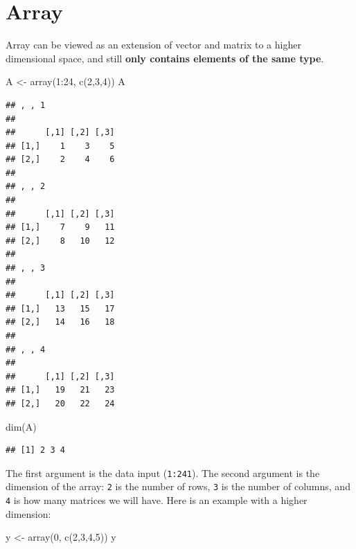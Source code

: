 \documentclass[
]{book}
\newenvironment{Shaded}{\begin{snugshade}}{\end{snugshade}}
\newcommand{\DecValTok}[1]{\textcolor[rgb]{0.00,0.00,0.81}{#1}}
\newcommand{\FunctionTok}[1]{\textcolor[rgb]{0.00,0.00,0.00}{#1}}
\newcommand{\NormalTok}[1]{#1}
\newcommand{\OtherTok}[1]{\textcolor[rgb]{0.56,0.35,0.01}{#1}}
\newcommand{\SpecialCharTok}[1]{\textcolor[rgb]{0.00,0.00,0.00}{#1}}
\theoremstyle{definition}
\theoremstyle{definition}
\theoremstyle{definition}
\theoremstyle{definition}
\theoremstyle{remark}
\begin{document}
\hypertarget{array}{%
\section{Array}\label{array}}

Array can be viewed as an extension of vector and matrix to a higher dimensional space, and still \textbf{only contains elements of the same type}.

\begin{Shaded}
\begin{Highlighting}[]
\NormalTok{A }\OtherTok{\textless{}{-}} \FunctionTok{array}\NormalTok{(}\DecValTok{1}\SpecialCharTok{:}\DecValTok{24}\NormalTok{, }\FunctionTok{c}\NormalTok{(}\DecValTok{2}\NormalTok{,}\DecValTok{3}\NormalTok{,}\DecValTok{4}\NormalTok{))}
\NormalTok{A}
\end{Highlighting}
\end{Shaded}

\begin{verbatim}
## , , 1
## 
##      [,1] [,2] [,3]
## [1,]    1    3    5
## [2,]    2    4    6
## 
## , , 2
## 
##      [,1] [,2] [,3]
## [1,]    7    9   11
## [2,]    8   10   12
## 
## , , 3
## 
##      [,1] [,2] [,3]
## [1,]   13   15   17
## [2,]   14   16   18
## 
## , , 4
## 
##      [,1] [,2] [,3]
## [1,]   19   21   23
## [2,]   20   22   24
\end{verbatim}

\begin{Shaded}
\begin{Highlighting}[]
\FunctionTok{dim}\NormalTok{(A)}
\end{Highlighting}
\end{Shaded}

\begin{verbatim}
## [1] 2 3 4
\end{verbatim}

The first argument is the data input (\texttt{1:241}). The second argument is the dimension of the array: \texttt{2} is the number of rows, \texttt{3} is the number of columns, and \texttt{4} is how many matrices we will have. Here is an example with a higher dimension:

\begin{Shaded}
\begin{Highlighting}[]
\NormalTok{y }\OtherTok{\textless{}{-}} \FunctionTok{array}\NormalTok{(}\DecValTok{0}\NormalTok{, }\FunctionTok{c}\NormalTok{(}\DecValTok{2}\NormalTok{,}\DecValTok{3}\NormalTok{,}\DecValTok{4}\NormalTok{,}\DecValTok{5}\NormalTok{))}
\NormalTok{y}
\end{Highlighting}
\end{Shaded}
\end{document}
